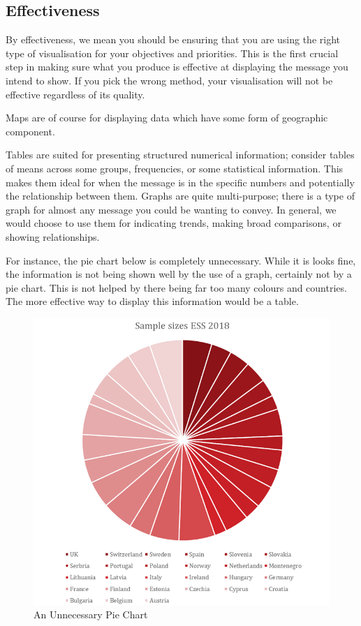 \documentclass[
]{book}
\begin{document}
\hypertarget{effectiveness}{%
\subsection{Effectiveness}\label{effectiveness}}

By effectiveness, we mean you should be ensuring that you are using the right type of visualisation for your objectives and priorities. This is the first crucial step in making sure what you produce is effective at displaying the message you intend to show. If you pick the wrong method, your visualisation will not be effective regardless of its quality.

Maps are of course for displaying data which have some form of geographic component.

Tables are suited for presenting structured numerical information; consider tables of means across some groups, frequencies, or some statistical information. This makes them ideal for when the message is in the specific numbers and potentially the relationship between them.
Graphs are quite multi-purpose; there is a type of graph for almost any message you could be wanting to convey. In general, we would choose to use them for indicating trends, making broad comparisons, or showing relationships.

For instance, the pie chart below is completely unnecessary. While it is looks fine, the information is not being shown well by the use of a graph, certainly not by a pie chart. This is not helped by there being far too many colours and countries. The more effective way to display this information would be a table.

\begin{figure}
\centering
\includegraphics{img/Bad pie chart.png}
\caption{An Unnecessary Pie Chart}
\end{figure}
\end{document}
